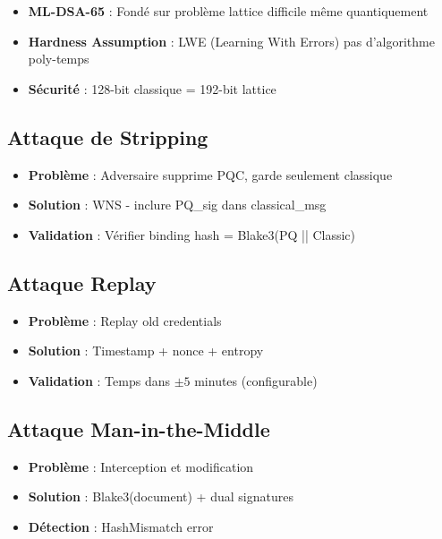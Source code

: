 \documentclass[12pt,a4paper]{report}
\begin{document}
\begin{itemize}
  \item \textbf{ML-DSA-65} : Fondé sur problème lattice difficile même quantiquement
  \item \textbf{Hardness Assumption} : LWE (Learning With Errors) pas d'algorithme poly-temps
  \item \textbf{Sécurité} : 128-bit classique = 192-bit lattice
\end{itemize}

\subsection{Attaque de Stripping}

\begin{itemize}
  \item \textbf{Problème} : Adversaire supprime PQC, garde seulement classique
  \item \textbf{Solution} : WNS - inclure PQ\_sig dans classical\_msg
  \item \textbf{Validation} : Vérifier binding hash = Blake3(PQ || Classic)
\end{itemize}

\subsection{Attaque Replay}

\begin{itemize}
  \item \textbf{Problème} : Replay old credentials
  \item \textbf{Solution} : Timestamp + nonce + entropy
  \item \textbf{Validation} : Temps dans $\pm 5$ minutes (configurable)
\end{itemize}

\subsection{Attaque Man-in-the-Middle}

\begin{itemize}
  \item \textbf{Problème} : Interception et modification
  \item \textbf{Solution} : Blake3(document) + dual signatures
  \item \textbf{Détection} : HashMismatch error
\end{itemize}
\end{document}
